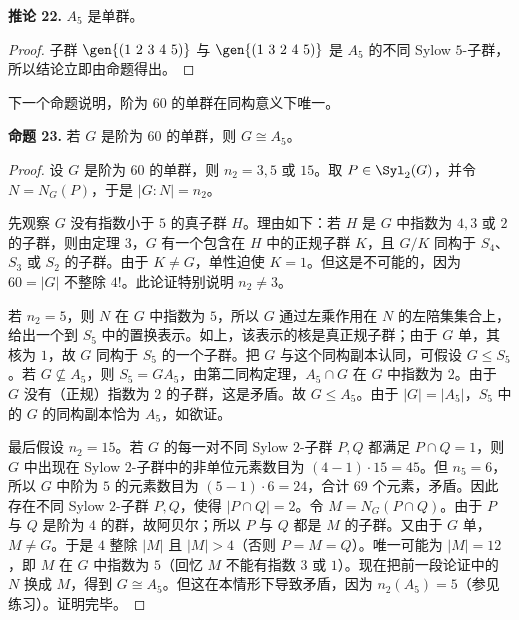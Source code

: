 \medskip
\noindent\textbf{推论 22.} $A_5$ 是单群。

\begin{proof}
子群 $\gen{(1\ 2\ 3\ 4\ 5)}$ 与 $\gen{(1\ 3\ 2\ 4\ 5)}$ 是 $A_5$ 的不同 Sylow $5$-子群，所以结论立即由命题得出。
\end{proof}

下一个命题说明，阶为 $60$ 的单群在同构意义下唯一。

\medskip
\noindent\textbf{命题 23.} 若 $G$ 是阶为 $60$ 的单群，则 $G\cong A_5$。

\begin{proof}
设 $G$ 是阶为 $60$ 的单群，则 $n_2=3,5$ 或 $15$。取 $P\in\Syl_2(G)$，并令 $N=N_G(P)$，于是 $|G:N|=n_2$。

先观察 $G$ 没有指数小于 $5$ 的真子群 $H$。理由如下：若 $H$ 是 $G$ 中指数为 $4,3$ 或 $2$ 的子群，则由定理 3，$G$ 有一个包含在 $H$ 中的正规子群 $K$，且 $G/K$ 同构于 $S_4$、$S_3$ 或 $S_2$ 的子群。由于 $K\neq G$，单性迫使 $K=1$。但这是不可能的，因为 $60=|G|$ 不整除 $4!$。此论证特别说明 $n_2\neq3$。

若 $n_2=5$，则 $N$ 在 $G$ 中指数为 $5$，所以 $G$ 通过左乘作用在 $N$ 的左陪集集合上，给出一个到 $S_5$ 中的置换表示。如上，该表示的核是真正规子群；由于 $G$ 单，其核为 $1$，故 $G$ 同构于 $S_5$ 的一个子群。把 $G$ 与这个同构副本认同，可假设 $G\leq S_5$。若 $G\not\subseteq A_5$，则 $S_5=GA_5$，由第二同构定理，$A_5\cap G$ 在 $G$ 中指数为 $2$。由于 $G$ 没有（正规）指数为 $2$ 的子群，这是矛盾。故 $G\leq A_5$。由于 $|G|=|A_5|$，$S_5$ 中的 $G$ 的同构副本恰为 $A_5$，如欲证。

最后假设 $n_2=15$。若 $G$ 的每一对不同 Sylow $2$-子群 $P,Q$ 都满足 $P\cap Q=1$，则 $G$ 中出现在 Sylow $2$-子群中的非单位元素数目为 $(4-1)\cdot15=45$。但 $n_5=6$，所以 $G$ 中阶为 $5$ 的元素数目为 $(5-1)\cdot6=24$，合计 $69$ 个元素，矛盾。因此存在不同 Sylow $2$-子群 $P,Q$，使得 $|P\cap Q|=2$。令 $M=N_G(P\cap Q)$。由于 $P$ 与 $Q$ 是阶为 $4$ 的群，故阿贝尔；所以 $P$ 与 $Q$ 都是 $M$ 的子群。又由于 $G$ 单，$M\neq G$。于是 $4$ 整除 $|M|$ 且 $|M|>4$（否则 $P=M=Q$）。唯一可能为 $|M|=12$，即 $M$ 在 $G$ 中指数为 $5$（回忆 $M$ 不能有指数 $3$ 或 $1$）。现在把前一段论证中的 $N$ 换成 $M$，得到 $G\cong A_5$。但这在本情形下导致矛盾，因为 $n_2(A_5)=5$（参见练习）。证明完毕。
\end{proof}


